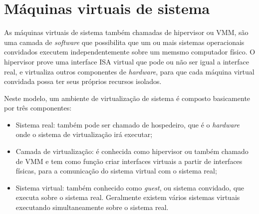 
\section{Máquinas virtuais de sistema}
\label{section:virtsistema}

As máquinas virtuais de sistema também chamadas de hipervisor ou \ac{VMM}, são uma camada de \textit{software} que possibilita
que um ou mais sistemas operacionais convidados executem independentemente sobre um memsmo computador físico. O hipervisor prove uma interface
\ac{ISA} virtual que pode ou não ser igual a interface real, e virtualiza outros componentes de \textit{hardware}, para que cada máquina
virtual convidada possa ter seus próprios recursos isolados.

Neste modelo, um ambiente de virtualização de sistema é composto basicamente por três componentes:
\begin{itemize}
 \item Sistema real: também pode ser chamado de hospedeiro, que é o \textit{hardware} onde o sistema de virtualização irá executar;
 \item Camada de virtualização: é conhecida como hipervisor ou também chamado de \ac{VMM} e tem como função criar interfaces virtuais a
 partir de interfaces físicas, para a comunicação do sistema virtual com o sistema real;
 \item Sistema virtual: também conhecido como \textit{guest}, ou sistema convidado, que executa sobre o sistema real. Geralmente
 existem vários sistemas virtuais executando simultaneamente sobre o sistema real.
\end{itemize}


